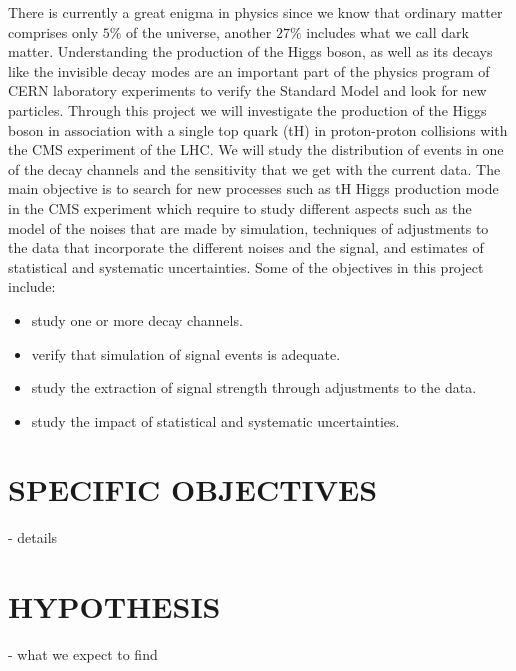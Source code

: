 \documentclass[final,3p]{CSP}
\begin{document}
\onehalfspacing There is currently a great enigma in physics since we know that ordinary matter comprises 
only $5\%$ of the universe, another 
$27\%$ includes what we call dark matter. Understanding the production of the Higgs boson, as 
well as its decays like the invisible decay modes are an important part of the physics 
program of CERN laboratory experiments to verify the Standard Model and look for new 
particles. Through this project we will investigate the production of the Higgs boson in 
association with a single top quark (tH) in proton-proton collisions with the CMS experiment 
of the LHC. We will study the distribution of events in one of the decay channels and the 
sensitivity that we get with the current data. The main objective is to search for new 
processes such as tH Higgs production mode in the CMS experiment which require to study 
different aspects such as the model of the noises that are made by simulation, techniques of 
adjustments to the data that incorporate the different noises and the signal, and estimates 
of statistical and systematic uncertainties.
Some of the objectives in this project include:\\
\begin{itemize}
\item study one or more decay channels.\\
\item verify that simulation of signal events is adequate.\\
\item study the extraction of signal strength through adjustments to the data.\\
\item study the impact of statistical and systematic uncertainties.\\
\end{itemize}

\section{SPECIFIC OBJECTIVES}
- details 

\section{HYPOTHESIS}
- what we expect to find
\end{document}
